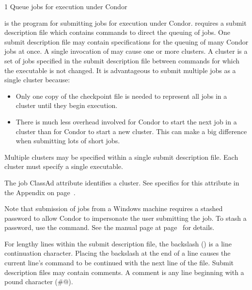 \begin{ManPage}{\label{man-condor-submit}}{1}
{Queue jobs for execution under Condor}
\Synopsis {}
\ToolDebugOption
\Lbr{}  \Opt{\Dots}\Rbr 
{}


\Description

 is the program for submitting jobs for execution
under Condor.
 requires a submit description file which contains commands
to direct the queuing of jobs.
One submit description file may contain
specifications for the queuing of many Condor jobs at once.
A single invocation of  may cause one or
more clusters.
A cluster is a set of jobs
specified in the submit description file
between  commands for which the executable is not changed.
It is advantageous to submit
multiple jobs as a single cluster because:
\begin{itemize}
\item Only one copy of the checkpoint file is needed to 
represent all jobs in a cluster until they begin execution.
\item There is much less overhead involved for Condor to start the next
job in a cluster than for Condor to start a new cluster.  This can make
a big difference when submitting lots of short jobs.
\end{itemize}

Multiple clusters may be specified within a single
submit description file.
Each cluster must specify a single executable.

The job ClassAd attribute  identifies a cluster.
See specifics for this attribute
in the Appendix on page~\pageref{sec:Job-ClassAd-Attributes}.

Note that submission of jobs from a Windows machine requires
a stashed password to allow Condor to impersonate the user submitting
the job.
To stash a password, use the  command.
See the manual page at
page~\pageref{man-condor-store-cred} for details.

For lengthy lines within the submit description file,
the backslash (\Bs) is a line continuation character.
Placing the backslash at the end of a line causes the current line's command
to be continued with the next line of the file.
Submit description files may contain comments.
A comment is any line beginning with a pound character (\verb@#@). 


\end{ManPage}
